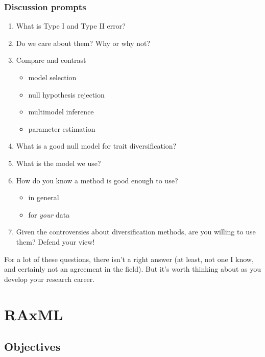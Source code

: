 \documentclass[]{article}
\providecommand{\tightlist}{%
  \setlength{\itemsep}{0pt}\setlength{\parskip}{0pt}}
\theoremstyle{definition}
\theoremstyle{definition}
\theoremstyle{definition}
\theoremstyle{remark}
\begin{document}
\hypertarget{discussion-prompts}{%
\subsubsection{Discussion prompts}\label{discussion-prompts}}

\begin{enumerate}
\def\labelenumi{\arabic{enumi}.}
\tightlist
\item
  What is Type I and Type II error?
\item
  Do we care about them? Why or why not?
\item
  Compare and contrast

  \begin{itemize}
  \tightlist
  \item
    model selection
  \item
    null hypothesis rejection
  \item
    multimodel inference
  \item
    parameter estimation
  \end{itemize}
\item
  What is a good null model for trait diversification?
\item
  What is the model we use?
\item
  How do you know a method is good enough to use?

  \begin{itemize}
  \tightlist
  \item
    in general
  \item
    for \emph{your} data
  \end{itemize}
\item
  Given the controversies about diversification methods, are you willing
  to use them? Defend your view!
\end{enumerate}

For a lot of these questions, there isn't a right answer (at least, not
one I know, and certainly not an agreement in the field). But it's worth
thinking about as you develop your research career.

\hypertarget{raxml}{%
\section{RAxML}\label{raxml}}

\hypertarget{objectives-6}{%
\subsection{Objectives}\label{objectives-6}}
\end{document}
